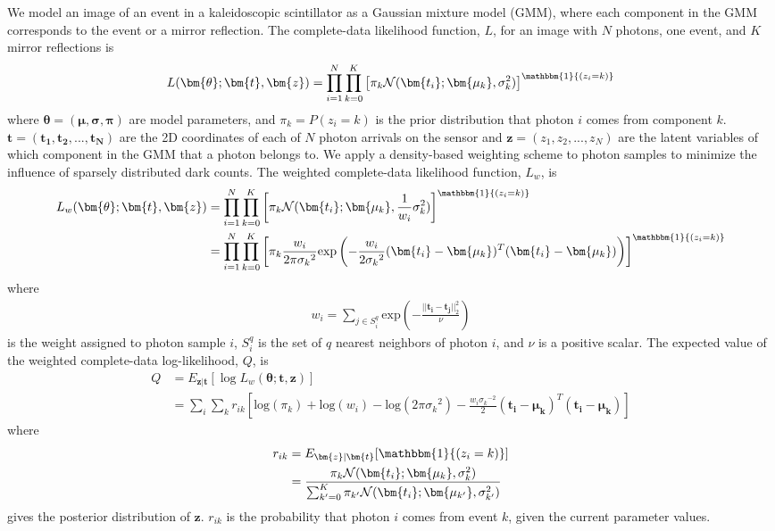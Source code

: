 We model an image of an event in a kaleidoscopic scintillator as a Gaussian 
mixture model (GMM), where each component in the GMM corresponds to the event or a 
mirror reflection.
The complete-data likelihood function, $L$, for an image with $N$ photons, 
one event, and $K$ mirror reflections is
\begin{equation}
L(\bm{\theta};\bm{t},\bm{z})=\prod_{i=1}^N \prod_{k=0}^K \left[ \pi_k \mathcal{N}(\bm{t_i};\bm{\mu_k},\sigma_k^2) \right]^{\mathbbm{1}{(z_i=k)}}
\end{equation}
where $\bm{\theta}=(\bm{\mu},\bm{\sigma},\bm{\pi})$ are model parameters, 
and $\pi_k=P(z_i=k)$ is the prior distribution that photon $i$ comes from 
component $k$.
$\bm{t}=(\bm{t_1}, \bm{t_2}, ..., \bm{t_N})$ are the 2D coordinates of each of 
$N$ photon arrivals on the sensor and $\bm{z}=(z_1, z_2, ..., z_N)$ are the latent 
variables of which component in the GMM that a photon belongs to.
We apply a density-based weighting scheme to photon samples to minimize the 
influence of sparsely distributed dark counts.
The weighted complete-data likelihood function, $L_w$, is 
\begin{align}
L_w(\bm{\theta};\bm{t},\bm{z}) &= \prod_{i=1}^N \prod_{k=0}^K \left[ \pi_k \mathcal{N}(\bm{t_i};\bm{\mu_k},\frac{1}{w_i}\sigma_k^2) \right]^{\mathbbm{1}{(z_i=k)}} \\
&= \prod_{i=1}^N \prod_{k=0}^K \left[ \pi_k \frac{w_i}{2\pi{\sigma_k}^2} \text{exp}\left( -\frac{w_i}{2{\sigma_k}^2} (\bm{t_i}-\bm{\mu_k})^T(\bm{t_i}-\bm{\mu_k}) \right) \right]^{\mathbbm{1}{(z_i=k)}}
\end{align}
where
\begin{align} \label{eqn:weights}
w_i = \sum_{j \in S_i^q} \text{exp} \left( -\frac{||\bm{t_i}-\bm{t_j}||_2^2}{\nu} \right)
\end{align}
is the weight assigned to photon sample $i$, $S_i^q$ is the set of $q$ 
nearest neighbors of photon $i$, and $\nu$ is a positive scalar.
The expected value of the weighted complete-data log-likelihood, $Q$, is
\begin{equation} \label{eqn:Q_eqn}
\begin{aligned}
Q & = E_{\bm{z}|\bm{t}}\left[\log L_w(\bm{\theta};\bm{t},\bm{z})\right] \\ & = \sum_i \sum_k r_{ik} \left[ \text{log}(\pi_k) + \text{log}(w_i) - \text{log}(2\pi{\sigma_k}^2) - \frac{w_i{\sigma_k}^{-2}}{2}(\bm{t_i}-\bm{\mu_k})^T(\bm{t_i}-\bm{\mu_k}) \right]
\end{aligned}
\end{equation}
where 
\begin{equation} \label{eqn:r_ik}
\begin{aligned}
r_{ik} & = E_{\bm{z}|\bm{t}}[\mathbbm{1}{(z_i=k)}] \\ & = \frac{\pi_k \mathcal{N}(\bm{t_i};\bm{\mu_k},{\sigma_k^2})}{\sum_{k'=0}^K \pi_{k'} \mathcal{N}(\bm{t_i};\bm{\mu_{k'}},{\sigma_{k'}^2})}
\end{aligned}
\end{equation}
gives the posterior distribution of $\bm{z}$.
$r_{ik}$ is the probability that photon $i$ comes from event $k$, given 
the current parameter values.

